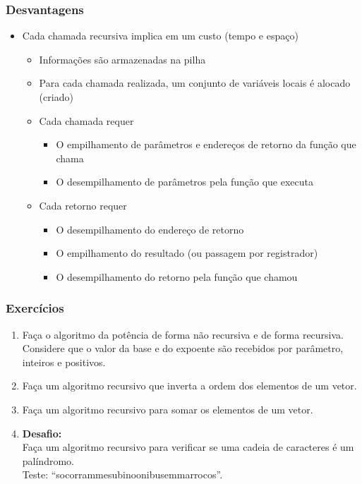 \documentclass[aspectratio=169]{beamer}
\begin{document}
\begin{frame}\frametitle{Desvantagens}
\begin{itemize}
	\item Cada chamada recursiva implica em um custo (tempo e espaço)
	\begin{itemize}
		\item Informações são armazenadas na pilha
		\item Para cada chamada realizada, um conjunto de variáveis locais é alocado (criado)
		\item Cada chamada requer
		\begin{itemize}
			\item O empilhamento de parâmetros e endereços de retorno da função que chama
			\item O desempilhamento de parâmetros pela função que executa
		\end{itemize}
		\item Cada retorno requer
		\begin{itemize}
			\item O desempilhamento do endereço de retorno
			\item O empilhamento do resultado (ou passagem por registrador)
			\item O desempilhamento do retorno pela função que chamou
		\end{itemize}
	\end{itemize}
\end{itemize}
\end{frame}

\begin{frame}\frametitle{Exercícios}
\begin{enumerate}
	\item Faça o algoritmo da potência de forma não recursiva e de forma recursiva. Considere que o valor da base e do expoente são recebidos por parâmetro, inteiros e positivos.
	\item Faça um algoritmo recursivo que inverta a ordem dos elementos de um vetor.
	\item Faça um algoritmo recursivo para somar os elementos de um vetor.
	\item \textbf{Desafio:}\\
	Faça um algoritmo recursivo para verificar se uma cadeia de caracteres é um palíndromo.\\
	Teste: ``socorrammesubinoonibusemmarrocos''.
\end{enumerate}
\end{frame}
\end{document}
